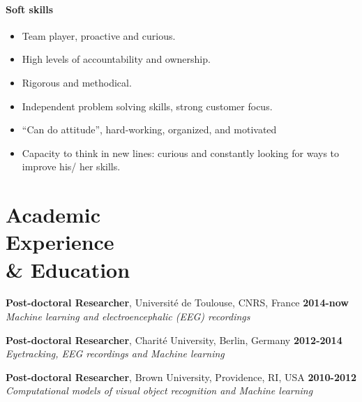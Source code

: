 \documentclass[margin,line]{resume}
\begin{document}
\begin{resume}
	\paragraph{Soft skills}
	\begin{itemize} \itemsep1pt \parskip0pt  \leftmargin=0em \itemindent=-1.5em
  		\item Team player, proactive and curious.
  		\item High levels of accountability and ownership.
		\item Rigorous and methodical.
		\item Independent problem solving skills, strong customer focus.
		\item “Can do attitude”, hard-working, organized, and motivated
		\item  Capacity to think in new lines: curious and constantly looking for ways to improve his/ her skills.
	\end{itemize}

  \vspace{3mm}
    \section{\mysidestyle  Academic \\ Experience\\ \& Education  }
    
  	\textbf{Post-doctoral Researcher}, Université de Toulouse, CNRS, France \hfill \textbf{2014-now}\\
	\textsl{Machine learning and electroencephalic (EEG) recordings}
  	
	\vspace{-1.5mm}		
	\textbf{Post-doctoral Researcher}, Charité University, Berlin, Germany \hfill \textbf{2012-2014}\\
	\textsl{Eyetracking, EEG recordings and Machine learning}
  	
	\vspace{-1.5mm}		
	\textbf{Post-doctoral Researcher}, Brown University, Providence, RI, USA \hfill \textbf{2010-2012}\\
	\textsl{Computational models of visual object recognition and Machine learning}


\end{resume}
\end{document}
